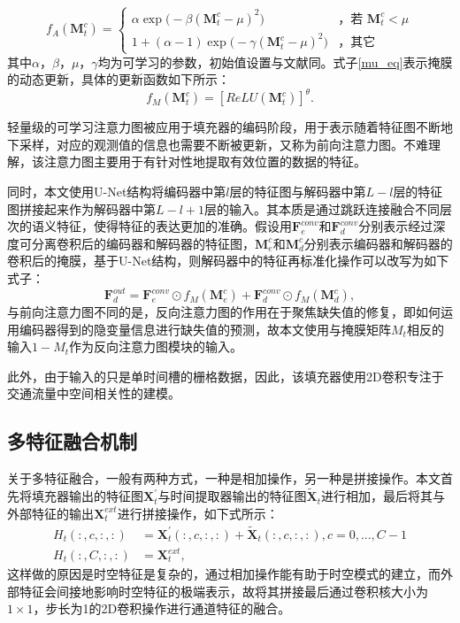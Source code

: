 \begin{equation}
    f_{A}(\mathbf{M}^{c}_{t})=
   \begin{cases}
   	\alpha \exp{\big (-\beta(\mathbf{M}^{c}_{t} - \mu)^2 \big)} &\mbox{，若 $\mathbf{M}^{c}_{t} < \mu$}\\
   	1 + (\alpha - 1) \exp{\big ( - \gamma(\mathbf{M}^{c}_{t} - \mu)^2 \big)} &\mbox{，其它}
   \end{cases}
\end{equation}
其中$\alpha$，$\beta$，$\mu$，$\gamma$均为可学习的参数，初始值设置与文献\cite[8861]{xie2019image}同。式子\eqref{mu_eq}表示掩膜的动态更新，具体的更新函数如下所示：
\begin{equation}
    f_{M}(\mathbf{M}^{c}_{t}) = \left [ ReLU(\mathbf{M}^{c}_{t}) \right ]^{\theta}.
\end{equation}

轻量级的可学习注意力图被应用于填充器的编码阶段，用于表示随着特征图不断地下采样，对应的观测值的信息也需要不断被更新，又称为前向注意力图。不难理解，该注意力图主要用于有针对性地提取有效位置的数据的特征。

同时，本文使用U-Net\cite{ronneberger2015u}结构将编码器中第$l$层的特征图与解码器中第$L-l$层的特征图拼接起来作为解码器中第$L-l+1$层的输入。其本质是通过跳跃连接融合不同层次的语义特征，使得特征的表达更加的准确。假设用$\mathbf{F}^{conv}_e$和$\mathbf{F}^{conv}_d$分别表示经过深度可分离卷积后的编码器和解码器的特征图，$\mathbf{M}^{c}_e$和$\mathbf{M}^{c}_d$分别表示编码器和解码器的卷积后的掩膜，基于U-Net结构，则解码器中的特征再标准化操作可以改写为如下式子：
\begin{equation}
	\mathbf{F}_{d}^{out} = \mathbf{F}^{conv}_e \odot f_{M}(\mathbf{M}^{c}_{e}) + \mathbf{F}^{conv}_d \odot f_{M}(\mathbf{M}^{c}_{d}),
\end{equation}
与前向注意力图不同的是，反向注意力图的作用在于聚焦缺失值的修复，即如何运用编码器得到的隐变量信息进行缺失值的预测，故本文使用与掩膜矩阵$M_t$相反的输入$1-M_t$作为反向注意力图模块的输入。

此外，由于输入的只是单时间槽的栅格数据，因此，该填充器使用2D卷积专注于交通流量中空间相关性的建模。



\subsection{多特征融合机制}
关于多特征融合，一般有两种方式，一种是相加操作，另一种是拼接操作。本文首先将填充器输出的特征图$\mathbf{X}_t^{'}$与时间提取器输出的特征图$\widetilde{\mathbf{X}}_t$进行相加，最后将其与外部特征的输出$\mathbf{X}_t^{ext}$进行拼接操作，如下式所示：
\begin{subequations} \label{fusion_eq}
\begin{align}
	H_t(:,c,:,:) & = \mathbf{X}_t^{'}(:,c,:,:) + \widetilde{\mathbf{X}}_t(:,c,:,:), c=0,...,C-1 \\
	H_t(:,C,:,:) & = \mathbf{X}_t^{ext},
\end{align}
\end{subequations}
这样做的原因是时空特征是复杂的，通过相加操作能有助于时空模式的建立，而外部特征会间接地影响时空特征的极端表示，故将其拼接最后通过卷积核大小为$1\times 1$，步长为1的2D卷积操作进行通道特征的融合。



